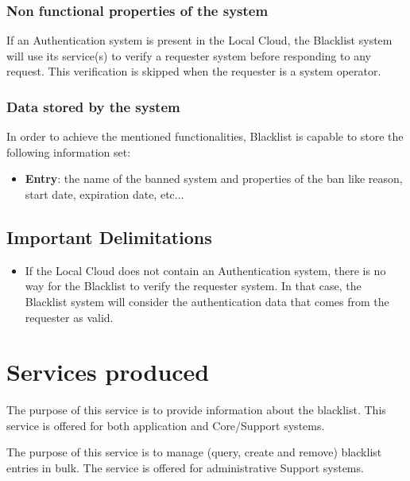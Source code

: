 \documentclass[a4paper]{arrowhead}
\begin{document}
\subsubsection {Non functional properties of the system}
If an Authentication system is present in the Local Cloud, the Blacklist system will use its service(s) to verify a requester system before responding to any request. This verification is skipped when the requester is a system operator.

\subsubsection {Data stored by the system}
In order to achieve the mentioned functionalities, Blacklist is capable to store the following information set:

\begin{itemize}
    \item \textbf{Entry}: the name of the banned system and properties of the ban like reason, start date, expiration date, etc...
\end{itemize}

\subsection{Important Delimitations}
\label{sec:delimitations}
\begin{itemize}
    \item If the Local Cloud does not contain an Authentication system, there is no way for the Blacklist to verify the requester system. In that case, the Blacklist system will consider the authentication data that comes from the requester as valid.
\end{itemize}

\newpage

\section{Services produced}
\label{sec:services}

{}
The purpose of this service is to provide information about the blacklist. This service is offered for both application and Core/Support systems.

The purpose of this service is to manage (query, create and remove) blacklist entries in bulk. The service is offered for administrative Support systems.
\end{document}
